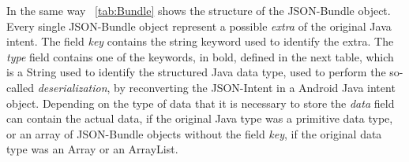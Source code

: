 In the same way \tablename~\ref{tab:Bundle} shows the structure of the JSON-Bundle object. Every single JSON-Bundle object represent a possible \textit{extra} of the original Java intent. The field \textit{key} contains the string keyword used to identify the extra. The \textit{type} field contains one of the keywords, in bold, defined in the next table, which is a String used to identify the structured Java data type, used to perform the so-called \textit{deserialization}, by reconverting the JSON-Intent in a Android Java intent object. Depending on the type of data that it is necessary to store the \textit{data} field can contain the actual data, if the original Java type was a primitive data type, or an array of JSON-Bundle objects without the field \textit{key}, if the original data type was an Array or an ArrayList.\\

	

